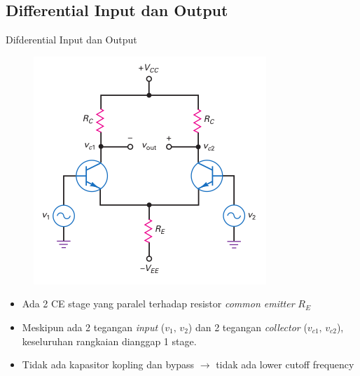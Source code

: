 \documentclass[aspectratio=169]{beamer}
\begin{document}
\subsection{Differential Input dan Output}
\begin{frame}{Difderential Input dan Output}
	\begin{multicols}{2}
		\begin{figure}
			\centering
			\includegraphics[height=0.7\textheight]{gambar/01.diff-amp/01.differential_input_output}
		\end{figure}
		\columnbreak
		\begin{itemize}
			\item Ada 2 CE stage yang paralel terhadap resistor \textit{common emitter} $ R_E $
			\item Meskipun ada 2 tegangan \textit{input} ($ v_1 \text{, } v_2$) dan 2 tegangan \textit{collector} ($ v_{c1} \text{, } v_{c2}$), keseluruhan rangkaian dianggap 1 stage.
			\item Tidak ada kapasitor kopling dan bypass $ \rightarrow $ tidak ada lower cutoff frequency
		\end{itemize}
	\end{multicols}
\end{frame}
\end{document}
